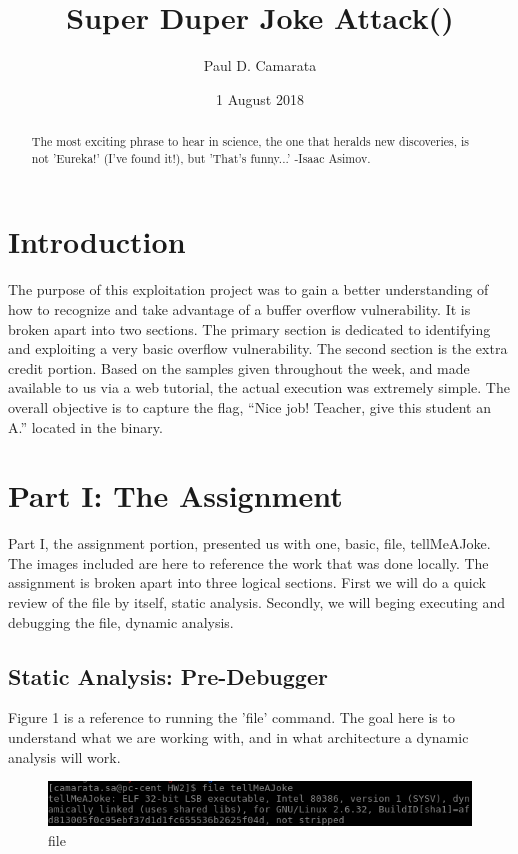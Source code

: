 \documentclass[10pt]{article}
\begin{document}
\title{Super Duper Joke Attack()}
\author{Paul D. Camarata}
\date{1 August 2018}

\maketitle
\pagebreak
\begin{abstract}
The most exciting phrase to hear in science, the one that heralds new discoveries, is not 'Eureka!' (I've found it!), but 'That's funny...' -Isaac Asimov.
\end{abstract}

\section{Introduction}
The purpose of this exploitation project was to gain a better understanding of how to recognize and take advantage of a buffer overflow vulnerability.  It is broken apart into two sections.  The primary section is dedicated to identifying and exploiting a very basic overflow vulnerability.  The second section is the extra credit portion.  Based on the samples given throughout the week, and made available to us via a web tutorial, the actual execution was extremely simple.  The overall objective is to capture the flag, “Nice job! Teacher, give this student an A.” located in the binary.  

\section{Part I: The Assignment}
Part I, the assignment portion, presented us with one, basic, file, tellMeAJoke.  The images included are here to reference the work that was done locally.  The assignment is broken apart into three logical sections.  First we will do a quick review of the file by itself, static analysis.  Secondly, we will beging executing and debugging the file, dynamic analysis.  

\subsection{Static Analysis: Pre-Debugger}
Figure 1 is a reference to running the 'file' command.  The goal here is to understand what we are working with, and in what architecture  a dynamic analysis will work.

\begin{figure}[H]
\centering
\includegraphics[scale=0.5]{./images/ss1.png}
\caption{file}
\label{fig:Code}
\end{figure}
\end{document}
